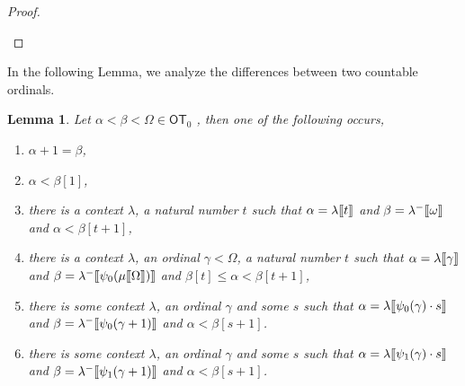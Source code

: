 \documentclass{amsart}
\theoremstyle{plain}
\theoremstyle{plain}
\newtheorem{lemma}[theorem]{Lemma}
\def\scbrl{[\hspace{-.14em}[}
\def\scbrr{]\hspace{-.14em}]}
\def\scbr#1{\scbrl#1\scbrr}
\newcommand\OT{\mathsf{OT}}
\newcommand{\Om}{{\Omega}}
\newcommand{\al}{{\alpha}}
\newcommand{\be}{{\beta}}
\newcommand{\ga}{\gamma}
\newcommand{\la}{\lambda}
\newcommand{\om}{\omega}
\def\scbrl{[\hspace{-.14em}[}
\def\scbrr{]\hspace{-.14em}]}
\def\scbr#1{\scbrl#1\scbrr}
\begin{document}
\begin{proof}
\begin{Cases}
\begin{Cases}
    \end{Cases}
\end{Cases}
\end{proof}


In the following Lemma, we analyze the differences between two countable ordinals.\begin{lemma}\label{lm:Context2}
Let $\al<\be<\Om \in \OT_0$ , then one of the following occurs,
\begin{enumerate}
    \item $\al+1=\be$,
    \item $\al<\be[1]$,
    \item there is a context $\la$, a natural number $t$ such that $\al=\la\scbr{t}$ and $\be=\la^-\scbr{\om}$ and $\al<\be[t+1]$,
    \item  there is a context $\la$, an ordinal $\ga<\Om$, a natural number $t$ such that $\al=\la\scbr{\ga}$ and $\be=\la^-\scbr{\psi_0(\mu\scbr{\Om})}$ and $\be[t]\leq\al<\be[t+1]$,
    \item \label{item:con1 lm:Context2} there is some context $\la$, an ordinal $\ga$ and some $s$ such that $\al=\la\scbr{\psi_0(\ga)\cdot s}$ and $\be=\la^-\scbr{\psi_0(\ga+1)}$ and $\al<\be[s+1]$.
    
    \item \label{item:con2 lm:Context2} there is some context $\la$, an ordinal $\ga$ and some $s$ such that $\al=\la\scbr{\psi_1(\ga)\cdot s}$ and $\be=\la^-\scbr{\psi_1(\ga+1)}$ and $\al<\be[s+1]$.
    
\end{enumerate}
\end{lemma}
\end{document}
